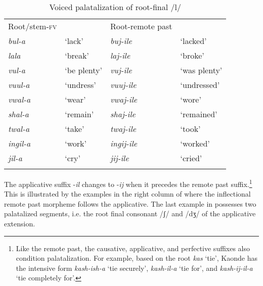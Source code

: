 \documentclass[output=paper]{langsci/langscibook}
\begin{document}
\begin{table}
\begin{tabular}{llll}
\lsptoprule
Root/stem-\textsc{fv} &  & Root-remote past & \\
\textit{bul-a} & `lack' & \textit{buj-ile} & `lacked' \\
\textit{lala} & `break' & \textit{laj-ile} & `broke' \\
\textit{vul-a} & `be plenty' & \textit{vuj-ile} & `was plenty' \\
\textit{vuul-a} & `undress' & \textit{vuuj-ile} & `undressed' \\
\textit{vwal-a} & `wear' & \textit{vwaj-ile} & `wore' \\
\textit{shal-a} & `remain' & \textit{shaj-ile} & `remained' \\
\textit{twal-a} & `take' & \textit{twaj-ile} & `took' \\
\textit{ingil-a} & `work' & \textit{ingij-ile} & `worked' \\
\textit{jil-a} & `cry' & \textit{jij-ile} & `cried' \\


\lspbottomrule
\end{tabular}

\caption{Voiced palatalization of root-final /l/}
\label{tab:12.kawasha}

\end{table}



The applicative suffix -\textit{il} changes to -\textit{ij} when it precedes the remote past suffix.\footnote{Like the remote past, the causative, applicative, and perfective suffixes also condition palatalization. For example, based on the root \textit{kas} ‘tie’, Kaonde has the intensive form \textit{kash-ish-a} ‘tie securely’, \textit{kash-il-a} ‘tie for’, and \textit{kash-ij-il-a} ‘tie completely for’.} This is illustrated by the examples in the right column of  where the inflectional remote past morpheme follows the applicative. The last example in  possesses two palatalized segments, i.e. the root final consonant /ʃ/ and /dʒ/ of the applicative extension. 
\end{document}
